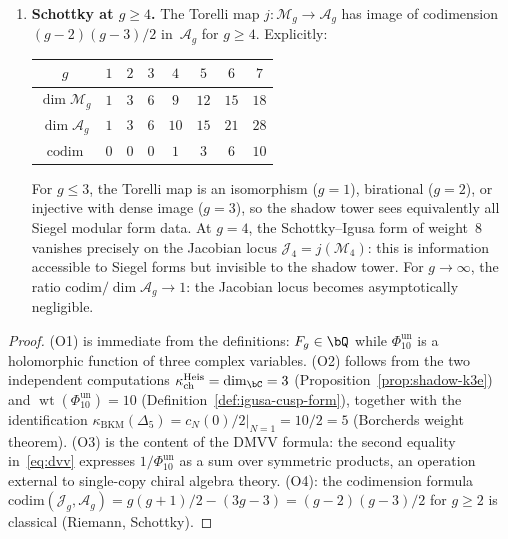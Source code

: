 \begin{theorem}
\begin{enumerate}[label=\textup{(O\arabic*)}]
orbifold construction are second-quantized operations
not captured by the shadow tower alone.
\item \textbf{Schottky at $g \geq 4$.}
The Torelli map $j\colon \mathcal{M}_g \to \mathcal{A}_g$
has image of codimension $(g-2)(g-3)/2$ in~$\mathcal{A}_g$
for $g \geq 4$. Explicitly:
\begin{center}
\small
\renewcommand{\arraystretch}{1.1}
\begin{tabular}{cccccccc}
$g$ & $1$ & $2$ & $3$ & $4$ & $5$ & $6$ & $7$ \\
\hline
$\dim \mathcal{M}_g$ & $1$ & $3$ & $6$ & $9$ & $12$ & $15$ & $18$ \\
$\dim \mathcal{A}_g$ & $1$ & $3$ & $6$ & $10$ & $15$ & $21$ & $28$ \\
$\mathrm{codim}$ & $0$ & $0$ & $0$ & $1$ & $3$ & $6$ & $10$
\end{tabular}
\end{center}
For $g \leq 3$, the Torelli map is an isomorphism
($g = 1$), birational ($g = 2$), or injective with dense
image ($g = 3$), so the shadow tower sees equivalently all
Siegel modular form data. At $g = 4$, the Schottky--Igusa
form of weight~$8$ vanishes precisely on the Jacobian locus
$\mathcal{J}_4 = j(\mathcal{M}_4)$: this is information
accessible to Siegel forms but invisible to the shadow tower.
For $g \to \infty$, the ratio
$\mathrm{codim}/\dim\mathcal{A}_g \to 1$: the Jacobian
locus becomes asymptotically negligible.
\end{enumerate}
\end{theorem}

\begin{proof}
(O1) is immediate from the definitions: $F_g \in \bQ$ while
\(\Phi_{10}^{\mathrm{un}}\) is a holomorphic function of three complex variables.
(O2) follows from the two independent computations
$\kappa_{\mathrm{ch}}^{\mathrm{Heis}} = \dim_\bC = 3$
(Proposition~\ref{prop:shadow-k3e}) and
\(\operatorname{wt}(\Phi_{10}^{\mathrm{un}}) = 10\)
(Definition~\ref{def:igusa-cusp-form}), together with the
identification $\kappa_{\mathrm{BKM}}(\Delta_5) = \left.c_N(0)/2\right|_{N=1} = 10/2 = 5$
(Borcherds weight theorem).
(O3) is the content of the DMVV formula: the
second equality in~\eqref{eq:dvv} expresses \(1/\Phi_{10}^{\mathrm{un}}\)
as a sum over symmetric products, an operation external to
single-copy chiral algebra theory.
(O4): the codimension formula
$\mathrm{codim}(\mathcal{J}_g, \mathcal{A}_g)
= g(g+1)/2 - (3g-3) = (g-2)(g-3)/2$ for $g \geq 2$ is
classical (Riemann, Schottky).
\end{proof}

